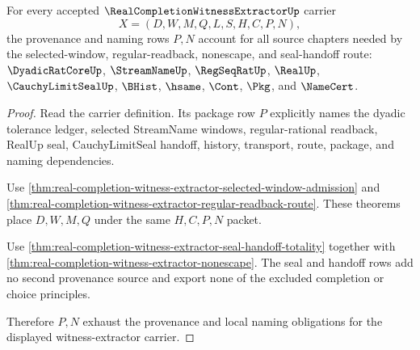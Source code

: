 \begin{theorem}
\label{thm:real-completion-witness-extractor-provenance-exhaustion}
For every accepted $\RealCompletionWitnessExtractorUp$ carrier
$$
X=(D,W,M,Q,L,S,H,C,P,N),
$$
the provenance and naming rows $P,N$ account for all source chapters needed by the selected-window, regular-readback, nonescape, and seal-handoff route: $\DyadicRatCoreUp$, $\StreamNameUp$, $\RegSeqRatUp$, $\RealUp$, $\CauchyLimitSealUp$, $\BHist$, $\hsame$, $\Cont$, $\Pkg$, and $\NameCert$.
\end{theorem}
\begin{proof}
Read the carrier definition. Its package row $P$ explicitly names the dyadic tolerance ledger, selected StreamName windows, regular-rational readback, RealUp seal, CauchyLimitSeal handoff, history, transport, route, package, and naming dependencies.

Use \autoref{thm:real-completion-witness-extractor-selected-window-admission} and \autoref{thm:real-completion-witness-extractor-regular-readback-route}. These theorems place $D,W,M,Q$ under the same $H,C,P,N$ packet.

Use \autoref{thm:real-completion-witness-extractor-seal-handoff-totality} together with \autoref{thm:real-completion-witness-extractor-nonescape}. The seal and handoff rows add no second provenance source and export none of the excluded completion or choice principles.

Therefore $P,N$ exhaust the provenance and local naming obligations for the displayed witness-extractor carrier.
\end{proof}

